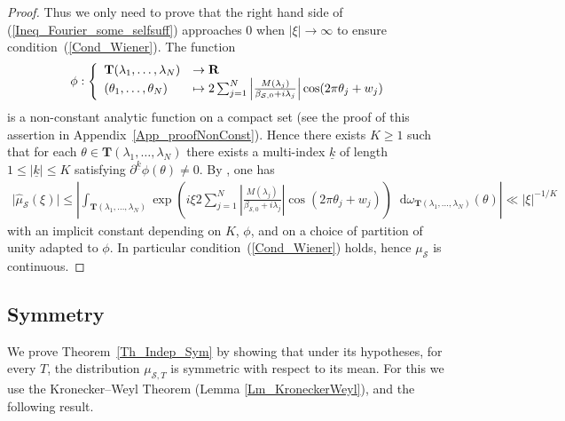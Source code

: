 \documentclass[a4paper,10pt]{amsart}
\theoremstyle{plain}
\theoremstyle{definition}
\begin{document}
\begin{proof}
Thus we only need to prove that the right hand side of (\ref{Ineq_Fourier_some_selfsuff}) 
approaches $0$ when $\lvert\xi\rvert\rightarrow\infty$ to ensure condition~(\ref{Cond_Wiener}).
The function
$$\phi : \left\lbrace
\begin{array}{l l}
\mathbf{T}(\lambda_{1},\ldots,\lambda_{N}) & \rightarrow \mathbf{R} \\
(\theta_{1},\ldots,\theta_{N}) &\mapsto 2\sum_{j=1}^{N}\left\lvert\frac{M(\lambda_{j})}{\beta_{\mathcal{S},0}+i\lambda_{j}}\right\rvert \cos(2\pi \theta_{j} + w_{j})
\end{array}
\right.$$
is a non-constant analytic function on a compact set (see the proof of this assertion in Appendix~\ref{App_proofNonConst}).
Hence there exists $K\geq 1$ such that for each $\theta\in \mathbf{T}(\lambda_{1},\ldots,\lambda_{N})$
there exists a multi-index $\underline{k}$ of length $1\leq \lvert \underline{k} \rvert \leq K$
satisfying $\partial^{\underline{k}}\phi(\theta) \neq 0$.
By \cite[VIII 2.2 Prop. 5]{Stein}, one has
\begin{align*}
\lvert\hat{\mu}_{\mathcal{S}}(\xi) \rvert \leq \left\lvert 
\int_{\mathbf{T}(\lambda_{1},\ldots,\lambda_{N})}\exp\left(i\xi 2\sum_{j=1}^{N}\left\lvert\frac{M(\lambda_{j})}{\beta_{\mathcal{S},0}+i\lambda_{j}}\right\rvert \cos(2\pi \theta_{j} + w_{j}) \right){\mathop{}\!\mathrm{d}}\omega_{\mathbf{T}(\lambda_{1},\ldots,\lambda_{N})}(\theta)
\right\rvert \ll \lvert\xi\rvert^{-1/K}
\end{align*}
with an implicit constant depending on $K$, $\phi$, and on a choice of partition of unity adapted to $\phi$. 
In particular condition~(\ref{Cond_Wiener}) holds, hence $\mu_{\mathcal{S}}$ is continuous.
\end{proof}

\subsection{Symmetry}\label{sub_Sym}

We prove Theorem~\ref{Th_Indep_Sym} by showing that under its hypotheses, for every $T$, 
the distribution $\mu_{\mathcal{S},T}$ is symmetric with respect to its mean.
For this we use the Kronecker--Weyl Theorem (Lemma \ref{Lm_KroneckerWeyl}),
and the following result.
\end{document}
